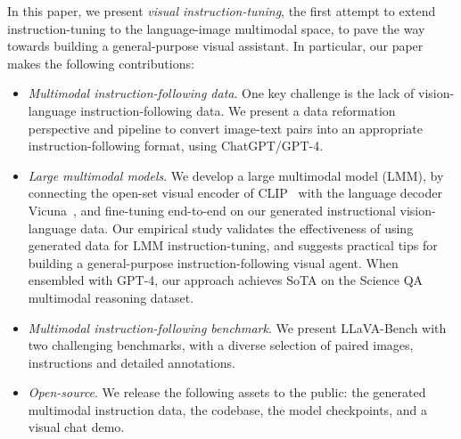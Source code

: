 In this paper, we present {\it visual instruction-tuning}, the first attempt to extend instruction-tuning to the language-image multimodal space, to pave the way towards building a general-purpose visual assistant. In particular, our paper makes the following contributions:

\begin{itemize}[leftmargin=7.5mm]
\setlength{\itemsep}{2pt}
\item 
{\it Multimodal instruction-following data}. One key challenge is the lack of vision-language instruction-following data. We present a data reformation perspective and pipeline to convert image-text pairs into an appropriate instruction-following format, using ChatGPT/GPT-4.

\item
{\it Large multimodal models}. We develop a large multimodal model (LMM), by connecting the open-set visual encoder of CLIP~\citep{radford2021learning} with the language decoder Vicuna~\cite{vicuna}, and fine-tuning end-to-end on our generated instructional vision-language data. 
Our empirical study validates the effectiveness of using generated data for LMM instruction-tuning, and suggests practical tips for building a general-purpose instruction-following visual agent. When ensembled with GPT-4, our approach achieves SoTA on the Science QA~\cite{lu2022learn} multimodal reasoning dataset. 

\item 
{\it Multimodal instruction-following benchmark}. We present LLaVA-Bench with two challenging benchmarks, with a diverse selection of paired images, instructions and detailed annotations.

\item
{\it Open-source}. We release the following assets to the public: the generated multimodal instruction data, the codebase, the model checkpoints, and a visual chat demo.

\end{itemize}

